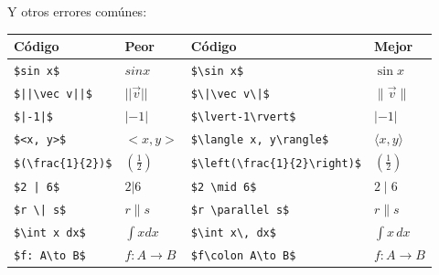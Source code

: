\documentclass[intro-breve-latex.tex]{subfiles}
\begin{document}
Y otros errores comúnes:
\begin{longtable}{|ll|ll|}
	\hline
	Código & Peor & Código & Mejor \\
	\hline
	\endhead

	\hline
	\endfoot

	\lstinline|$sin x$| & $sin x$ & \lstinline|$\sin x$| & $\sin x$ \\
	\lstinline?$||\vec v||$? & $||\vec v||$ & \lstinline?$\|\vec v\|$? & $\|\vec v\|$ \\
	\lstinline?$|-1|$? & $|-1|$ & \lstinline|$\lvert-1\rvert$| & $\lvert-1\rvert$ \\
	\lstinline?$<x, y>$? & $<x, y>$ & \lstinline?$\langle x, y\rangle$? & $\langle x, y\rangle$ \\
	\lstinline?$(\frac{1}{2})$? & $\displaystyle (\frac{1}{2}) $ & \lstinline|$\left(\frac{1}{2}\right)$| & $\displaystyle \left(\frac{1}{2}\right) $ \\
	\lstinline?$2 | 6$? & $2 | 6$ & \lstinline|$2 \mid 6$| & $2 \mid 6$ \\
	\lstinline?$r \| s$? & $r \| s$ & \lstinline|$r \parallel s$| & $r \parallel s$ \\
	\lstinline|$\int x dx$| & $\int x dx$ & \lstinline|$\int x\, dx$| & $\int x\, dx$ \\
	\lstinline|$f: A\to B$| & $f: A\to B$ & \lstinline|$f\colon A\to B$| & $f\colon A\to B$ \\
\end{longtable}
\end{document}
